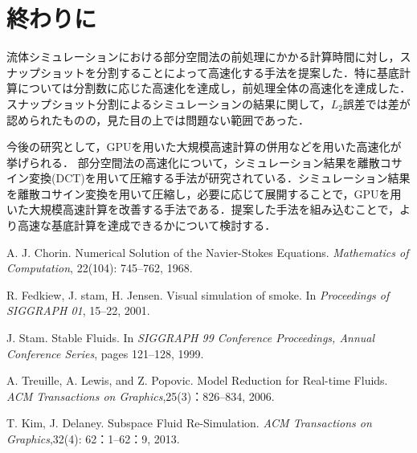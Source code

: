 \documentclass[uplatex,dvipdfmx,10pt,a4paper,notitlepage,oneside,twocolumn]{abst_jsarticle}
\begin{document}
\section{終わりに}
流体シミュレーションにおける部分空間法の前処理にかかる計算時間に対し，スナップショットを分割することによって高速化する手法を提案した．特に基底計算については分割数に応じた高速化を達成し，前処理全体の高速化を達成した．スナップショット分割によるシミュレーションの結果に関して，$L_2$誤差では差が認められたものの，見た目の上では問題ない範囲であった．

今後の研究として，GPUを用いた大規模高速計算の併用などを用いた高速化が挙げられる．
部分空間法の高速化について，シミュレーション結果を離散コサイン変換(DCT)を用いて圧縮する手法が研究されている．シミュレーション結果を離散コサイン変換を用いて圧縮し，必要に応じて展開することで，GPUを用いた大規模高速計算を改善する手法である．提案した手法を組み込むことで，より高速な基底計算を達成できるかについて検討する．
\begin{thebibliography}{99}

A. J. Chorin. Numerical Solution of the Navier-Stokes Equations. \textit{Mathematics of Computation}, 22(104): 745--762, 1968.

R. Fedkiew, J. stam, H. Jensen. Visual simulation of smoke. In \textit{Proceedings of SIGGRAPH 01}, 15--22, 2001.

J. Stam. Stable Fluids. In \textit{SIGGRAPH 99 Conference Proceedings, Annual Conference Series}, pages 121--128, 1999.

A. Treuille, A. Lewis, and Z. Popovic. Model Reduction for Real-time Fluids. \textit{ACM Transactions on Graphics},25(3)：826--834, 2006.

T. Kim, J. Delaney. Subspace Fluid Re-Simulation. \textit{ACM Transactions on Graphics},32(4): 62：1--62：9, 2013.

\end{thebibliography}
\end{document}
